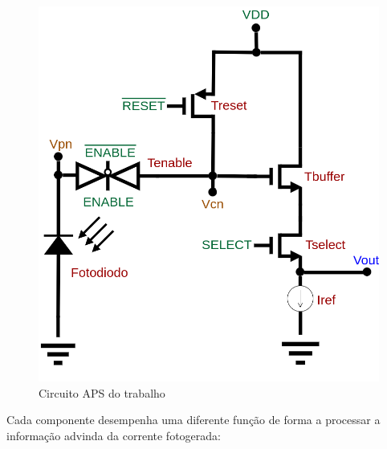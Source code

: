 \begin{figure}[!h]
	\caption{\label{fig_APS}Circuito APS do trabalho}
	\begin{center}
	    \includegraphics[scale=0.3]{Circuitos/APS.png}
	\end{center}
\end{figure}

Cada componente desempenha uma diferente função de forma a processar a informação advinda da corrente fotogerada:

